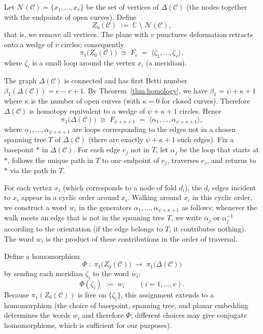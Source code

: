 \documentclass[article,11pt]{amsart} \numberwithin{equation}{section}
\numberwithin{equation}{section}
\begin{document}
{Let \(\mathcal{N}(\mathcal{C}) = \{x_1,\dots,x_v\}\) be the set of vertices of \(\Delta(\mathcal{C})\) (the nodes together with the endpoints of open curves).  
Define
\[
Z_0(\mathcal{C}) \;:=\; \mathbb{C} \;\setminus\; \mathcal{N}(\mathcal{C}),
\]
that is, we remove all vertices.  
The plane with \(v\) punctures deformation retracts onto a wedge of \(v\) circles; consequently
\[
\pi_1\!\bigl(Z_0(\mathcal{C})\bigr) \;\cong\; F_v \;=\; \langle \zeta_1,\dots,\zeta_v \rangle,
\]
where \(\zeta_i\) is a small loop around the vertex \(x_i\) (a meridian).

The graph \(\Delta(\mathcal{C})\) is connected and has first Betti number \(\beta_1(\Delta(\mathcal{C})) = e - v + 1\). By Theorem~\ref{thm:homology}, we have \(\beta_1 = \psi + \kappa + 1\) where \(\kappa\) is the number of open curves (with \(\kappa=0\) for closed curves). Therefore \(\Delta(\mathcal{C})\) is homotopy equivalent to a wedge of \(\psi+\kappa+1\) circles.  Hence
\[
\pi_1\!\bigl(\Delta(\mathcal{C})\bigr) \;\cong\; F_{\psi+\kappa+1} \;=\; \langle \alpha_1,\dots,\alpha_{\psi+\kappa+1} \rangle,
\]
where \(\alpha_1,\dots,\alpha_{\psi+\kappa+1}\) are loops corresponding to the edges not in a chosen spanning tree \(T\) of \(\Delta(\mathcal{C})\) (there are exactly \(\psi+\kappa+1\) such edges).  Fix a basepoint \(*\) in \(\Delta(\mathcal{C})\).  For each edge \(e_j\) not in \(T\), let \(\alpha_j\) be the loop that starts at \(*\), follows the unique path in \(T\) to one endpoint of \(e_j\), traverses \(e_j\), and returns to \(*\) via the path in \(T\).

For each vertex \(x_i\) (which corresponds to a node of fold \(d_i\)), the \(d_i\) edges incident to \(x_i\) appear in a cyclic order around \(x_i\).  Walking around \(x_i\) in this cyclic order, we construct a word \(w_i\) in the generators \(\alpha_1,\dots,\alpha_{\psi+\kappa+1}\) as follows: whenever the walk meets an edge that is not in the spanning tree \(T\), we write \(\alpha_j\) or \(\alpha_j^{-1}\) according to the orientation (if the edge belongs to \(T\), it contributes nothing).  The word \(w_i\) is the product of these contributions in the order of traversal.

Define a homomorphism
\[
\Phi \;:\; \pi_1\!\bigl(Z_0(\mathcal{C})\bigr) \;\longrightarrow\; \pi_1\!\bigl(\Delta(\mathcal{C})\bigr)
\]
by sending each meridian \(\zeta_i\) to the word \(w_i\):
\[
\Phi(\zeta_i) \;:=\; w_i \qquad (i=1,\dots,v).
\]
Because \(\pi_1(Z_0(\mathcal{C}))\) is free on \(\{\zeta_i\}\), this assignment extends to a homomorphism (the choice of basepoint, spanning tree, and planar embedding determines the words \(w_i\) and therefore \(\Phi\); different choices may give conjugate homomorphisms, which is sufficient for our purposes).

}
\end{document}
